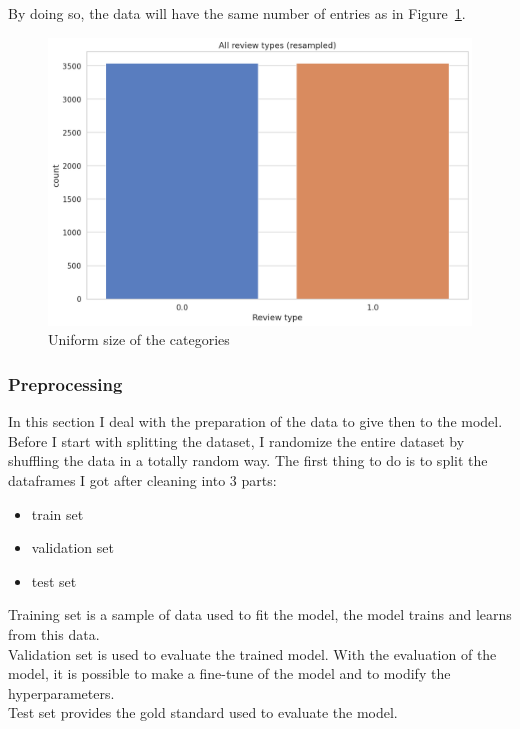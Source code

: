 By doing so, the data will have  the same number of entries as in Figure~\ref{fig:fig_05}.

\begin{figure}[H]
\centering
\includegraphics[width=1\textwidth]{images/output_47_0.png}
\caption{Uniform size of the categories}
\label{fig:fig_05}
\end{figure}
\FloatBarrier

\subsubsection{Preprocessing}
In this section I deal with the preparation of the data to give then to the model.
Before I start with splitting the dataset, I randomize the entire dataset by shuffling the data in a totally random way. 
The first thing to do is to split the dataframes I got after cleaning into 3 parts:
\begin{itemize}
    \item train set
    \item validation set
    \item test set
\end{itemize}

Training set is a sample of data used to fit the model, the model trains and learns from this data.\\
Validation set is used to evaluate the trained model. With the evaluation of the model, it is possible to make a fine-tune of the model and to modify the hyperparameters.\\
Test set provides the gold standard used to evaluate the model.\\

